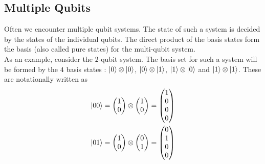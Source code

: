 \subsection{Multiple Qubits}
Often we encounter multiple qubit systems. The state of such a system is decided by the states of the individual qubits. The direct product of the basis states form the basis (also called pure states) for the multi-qubit system.\\
As an example, consider the $2$-qubit system. The basis set for such a system will be formed by the $4$ basis states : $\left\vert 0\right\rangle\otimes\left\vert 0\right\rangle$, $\left\vert 0\right\rangle\otimes\left\vert 1\right\rangle$, $\left\vert 1\right\rangle\otimes\left\vert 0\right\rangle$ and $\left\vert 1\right\rangle\otimes\left\vert 1\right\rangle$. These are notationally written as \\
\begin{equation*}
\begin{split}
\left\vert 00\right\rangle&=
\begin{pmatrix}
1\\
0
\end{pmatrix}
\otimes
\begin{pmatrix}
1\\
0
\end{pmatrix}=
\begin{pmatrix}
1\\
0\\
0\\
0
\end{pmatrix}
\\
\left\vert 01\right\rangle&=
\begin{pmatrix}
1\\
0
\end{pmatrix}
\otimes
\begin{pmatrix}
0\\
1
\end{pmatrix}=
\begin{pmatrix}
0\\
1\\
0\\
0
\end{pmatrix}
\end{split}
\end{equation*}
